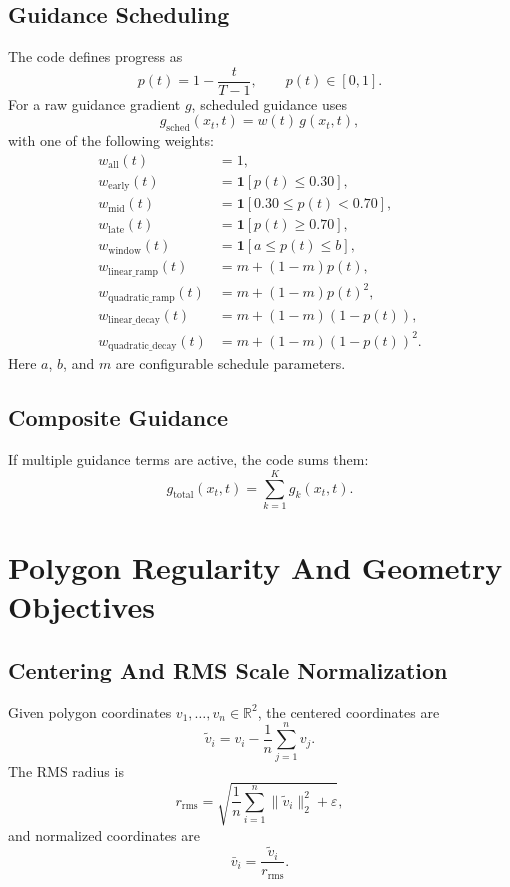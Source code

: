 \documentclass[11pt]{article}
\newcommand{\R}{\mathbb{R}}
\begin{document}
\subsection{Guidance Scheduling}
The code defines progress as
\begin{equation}
p(t) = 1 - \frac{t}{T-1},
\qquad p(t) \in [0,1].
\end{equation}
For a raw guidance gradient $g$, scheduled guidance uses
\begin{equation}
g_{\mathrm{sched}}(x_t,t) = w(t)\,g(x_t,t),
\end{equation}
with one of the following weights:
\begin{align}
w_{\mathrm{all}}(t) &= 1, \\
w_{\mathrm{early}}(t) &= \mathbf{1}[p(t) \le 0.30], \\
w_{\mathrm{mid}}(t) &= \mathbf{1}[0.30 \le p(t) < 0.70], \\
w_{\mathrm{late}}(t) &= \mathbf{1}[p(t) \ge 0.70], \\
w_{\mathrm{window}}(t) &= \mathbf{1}[a \le p(t) \le b], \\
w_{\mathrm{linear\_ramp}}(t) &= m + (1-m)p(t), \\
w_{\mathrm{quadratic\_ramp}}(t) &= m + (1-m)p(t)^2, \\
w_{\mathrm{linear\_decay}}(t) &= m + (1-m)(1-p(t)), \\
w_{\mathrm{quadratic\_decay}}(t) &= m + (1-m)(1-p(t))^2.
\end{align}
Here $a$, $b$, and $m$ are configurable schedule parameters.

\subsection{Composite Guidance}
If multiple guidance terms are active, the code sums them:
\begin{equation}
g_{\mathrm{total}}(x_t,t)
=
\sum_{k=1}^K g_k(x_t,t).
\end{equation}

\section{Polygon Regularity And Geometry Objectives}
\subsection{Centering And RMS Scale Normalization}
Given polygon coordinates $v_1,\dots,v_n \in \R^2$, the centered coordinates are
\begin{equation}
\tilde{v}_i = v_i - \frac{1}{n}\sum_{j=1}^n v_j.
\end{equation}
The RMS radius is
\begin{equation}
r_{\mathrm{rms}} = \sqrt{\frac{1}{n}\sum_{i=1}^n \|\tilde{v}_i\|_2^2 + \varepsilon},
\end{equation}
and normalized coordinates are
\begin{equation}
\bar{v}_i = \frac{\tilde{v}_i}{r_{\mathrm{rms}}}.
\end{equation}
\end{document}

